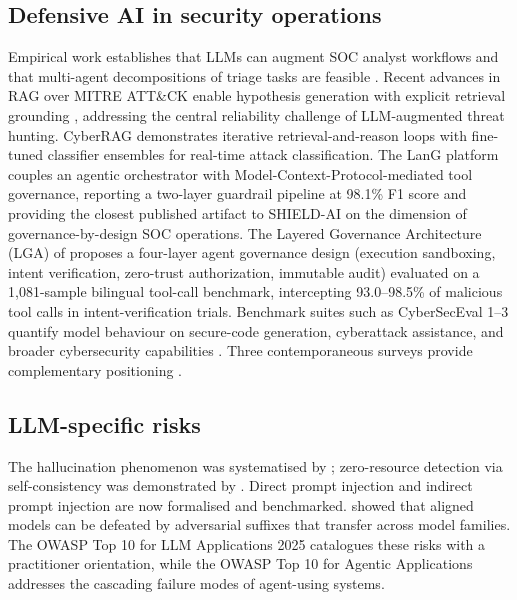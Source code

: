 \documentclass[preprint,12pt,authoryear]{elsarticle}
\begin{document}
\subsection{Defensive AI in security operations}
Empirical work establishes that LLMs can augment SOC analyst workflows \citep{llmsoc2025} and that multi-agent decompositions of triage tasks are feasible \citep{cortex2025}. Recent advances in RAG over MITRE ATT\&CK enable hypothesis generation with explicit retrieval grounding \citep{techniquerag2025,fayyazi2024llm,cyberrag2025}, addressing the central reliability challenge of LLM-augmented threat hunting. CyberRAG \citep{cyberrag2025} demonstrates iterative retrieval-and-reason loops with fine-tuned classifier ensembles for real-time attack classification. The LanG platform \citep{lang2026} couples an agentic orchestrator with Model-Context-Protocol-mediated tool governance, reporting a two-layer guardrail pipeline at 98.1\% F1 score and providing the closest published artifact to SHIELD-AI on the dimension of governance-by-design SOC operations. The Layered Governance Architecture (LGA) of \citet{lga2026} proposes a four-layer agent governance design (execution sandboxing, intent verification, zero-trust authorization, immutable audit) evaluated on a 1{,}081-sample bilingual tool-call benchmark, intercepting 93.0--98.5\% of malicious tool calls in intent-verification trials. Benchmark suites such as CyberSecEval 1--3 quantify model behaviour on secure-code generation, cyberattack assistance, and broader cybersecurity capabilities \citep{bhatt2023cyberseceval,bhatt2024cyberseceval2,wan2024cyberseceval3}. Three contemporaneous surveys provide complementary positioning \citep{yao2024survey,llmsurvey2024,contextualizedai2024}.

\subsection{LLM-specific risks}
\label{ssec:risks}
The hallucination phenomenon was systematised by \citet{ji2023hallucination}; zero-resource detection via self-consistency was demonstrated by \citet{manakul2023selfcheckgpt}. Direct prompt injection \citep{liu2024formalizing} and indirect prompt injection \citep{greshake2023indirect} are now formalised and benchmarked. \citet{zou2023universal} showed that aligned models can be defeated by adversarial suffixes that transfer across model families. The OWASP Top 10 for LLM Applications 2025 \citep{owasp2025llm} catalogues these risks with a practitioner orientation, while the OWASP Top 10 for Agentic Applications \citep{owasp2025agentic} addresses the cascading failure modes of agent-using systems.
\end{document}
